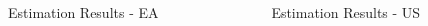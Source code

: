 \documentclass[final]{beamer}
\begin{document}
\begin{frame}
\begin{columns}[t]
\begin{column}{.53 \linewidth}
\begin{columns}[c]
\begin{column}{.48 \linewidth}
\begin{block}{Estimation Results - EA}
\end{block}%

\end{column}%

\begin{column}{.48 \linewidth}%

\begin{block}{Estimation Results - US}%


\end{block}
\end{column}
\end{columns}
\end{column}
\end{columns}
\end{frame}
\end{document}
